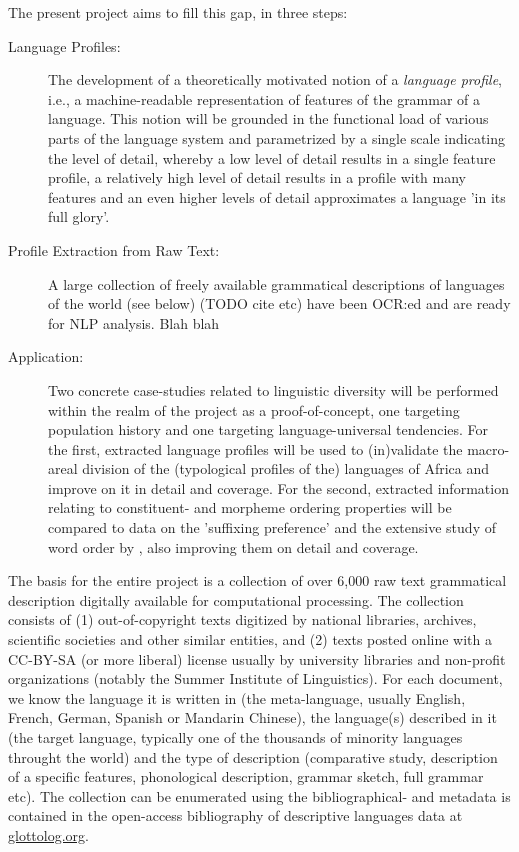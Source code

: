 ﻿\documentclass[12pt]{article}
\begin{document}
The present project aims to fill this gap, in three steps:
\begin{description}
\item[Language Profiles:] The development of a theoretically motivated
  notion of a \emph{language profile}, i.e., a machine-readable
  representation of features of the grammar of a language. This notion
  will be grounded in the functional load of various parts of the
  language system and parametrized by a single scale indicating the
  level of detail, whereby a low level of detail results in a single
  feature profile, a relatively high level of detail results in a
  profile with many features and an even higher levels of detail
  approximates a language 'in its full glory'.

\item[Profile Extraction from Raw Text:] A large collection of freely
  available grammatical descriptions of languages of the world
  (see below)
  (TODO cite etc) have been OCR:ed and are ready for NLP analysis.
  Blah blah 

\item[Application:] Two concrete case-studies related to linguistic
  diversity will be performed within the realm of the project as a
  proof-of-concept, one targeting population history and one targeting
  language-universal tendencies. For the first, extracted language
  profiles will be used to (in)validate the macro-areal division of
  the (typological profiles of the) languages of Africa
  \citep{hv:Guldemann:Africa:Macro-Areas} and improve on it in detail
  and coverage. For the second, extracted information relating to
  constituent- and morpheme ordering properties will be compared to
  data on the 'suffixing preference'
  \citep{ling:Himmelmann:Suffixing:2014} and the extensive study of
  word order by \citet{ling:Dryer:Word-Order}, also improving them on
  detail and coverage.
\end{description}

The basis for the entire project is a collection of over 6,000 raw
text grammatical description digitally available for computational
processing. The collection consists of (1) out-of-copyright texts
digitized by national libraries, archives, scientific societies and
other similar entities, and (2) texts posted online with a CC-BY-SA (or
more liberal) license usually by university libraries and non-profit
organizations (notably the Summer Institute of Linguistics). For each
document, we know the language it is written in (the meta-language,
usually English, French, German, Spanish or Mandarin Chinese), the
language(s) described in it (the target language, typically one of the
thousands of minority languages throught the world) and the type of
description (comparative study, description of a specific features,
phonological description, grammar sketch, full grammar etc). The
collection can be enumerated using the bibliographical- and metadata
is contained in the open-access bibliography of descriptive languages
data at \url{glottolog.org}.
\end{document}
